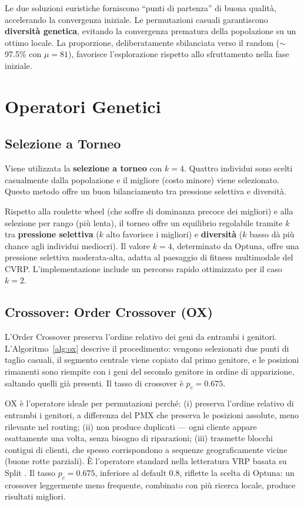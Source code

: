 Le due soluzioni euristiche forniscono ``punti di partenza'' di buona qualit\`a,
accelerando la convergenza iniziale. Le permutazioni casuali garantiscono
\textbf{diversit\`a genetica}, evitando la convergenza prematura della popolazione
su un ottimo locale. La proporzione, deliberatamente sbilanciata verso il random
($\sim$97.5\% con $\mu=81$), favorisce l'esplorazione rispetto allo sfruttamento
nella fase iniziale.

\section{Operatori Genetici}

\subsection{Selezione a Torneo}

Viene utilizzata la \textbf{selezione a torneo} \cite{goldberg1991comparative} con $k = 4$. Quattro individui sono
scelti casualmente dalla popolazione e il migliore (costo minore) viene selezionato.
Questo metodo offre un buon bilanciamento tra pressione selettiva e diversit\`a.

Rispetto alla roulette wheel (che soffre di dominanza precoce dei migliori) e alla
selezione per rango (pi\`u lenta), il torneo offre un equilibrio regolabile tramite
$k$ tra \textbf{pressione selettiva} ($k$ alto favorisce i migliori) e
\textbf{diversit\`a} ($k$ basso d\`a pi\`u chance agli individui mediocri). Il
valore $k=4$, determinato da Optuna, offre una pressione selettiva moderata-alta,
adatta al paesaggio di fitness multimodale del CVRP. L'implementazione include un
percorso rapido ottimizzato per il caso $k=2$.

\subsection{Crossover: Order Crossover (OX)}

L'Order Crossover \cite{davis1985applying} preserva l'ordine relativo dei geni da entrambi i genitori.
L'Algoritmo~\ref{alg:ox} descrive il procedimento: vengono selezionati due punti di
taglio casuali, il segmento centrale viene copiato dal primo genitore, e le posizioni
rimanenti sono riempite con i geni del secondo genitore in ordine di apparizione,
saltando quelli gi\`a presenti. Il tasso di crossover \`e $p_c = 0.675$.

OX \`e l'operatore ideale per permutazioni perch\'e: (i) preserva l'ordine relativo
di entrambi i genitori, a differenza del PMX che preserva le posizioni assolute,
meno rilevante nel routing; (ii) non produce duplicati --- ogni cliente appare
esattamente una volta, senza bisogno di riparazioni; (iii) trasmette blocchi
contigui di clienti, che spesso corrispondono a sequenze geograficamente vicine
(buone rotte parziali). \`E l'operatore standard nella letteratura VRP basata su
Split \cite{prins2004simple, vidal2012unified}. Il tasso $p_c = 0.675$, inferiore al
default 0.8, riflette la scelta di Optuna: un crossover leggermente meno frequente,
combinato con pi\`u ricerca locale, produce risultati migliori.


